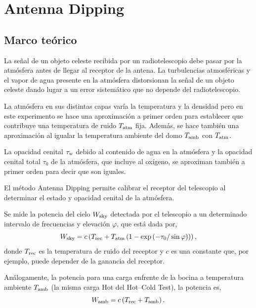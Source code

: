 \section{Antenna Dipping}\label{sec:antennadipping}

\subsection{Marco teórico}

La señal de un objeto celeste recibida por un radiotelescopio debe pasar por la atmósfera antes de llegar al receptor de la antena. La turbulencias atmosféricas y el vapor de agua presente en la atmósfera distorsionan la señal de un objeto celeste dando lugar a un error sistemático que no depende del radiotelescopio.

La atmósfera en sus distintas capas varía la temperatura y la densidad pero en este experimento se hace una aproximación a primer orden para establecer que contribuye una temperatura de ruido $T_\textnormal{atm}$ fija. Además, se hace también una aproximación al igualar la temperatura ambiente del domo $T_\textnormal{amb}$ con $T_\textnormal{atm}$.

La opacidad cenital $\tau_\textnormal{w}$ debido al contenido de agua en la atmósfera y la opacidad cenital total $\tau_0$ de la atmósfera, que incluye al oxígeno, se aproximan también a primer orden para decir que son iguales.

El método Antenna Dipping permite calibrar el receptor del telescopio al determinar el estado y opacidad cenital de la atmósfera.

Se mide la potencia del cielo $W_\textnormal{sky}$ detectada por el telescopio a un determinado intervalo de frecuencias y elevación $\varphi$, que está dada por,
\begin{equation}
W_\textnormal{sky}=c\left(T_\textnormal{rec}+T_\textnormal{atm}\left(1-\exp\left(-\tau_\textnormal{0}/\sin\varphi\right)\right)\right)
,\end{equation}
donde $T_\textnormal{rec}$ es la temperatura de ruido del receptor y $c$ es una constante que, por ejemplo, puede depender de la ganancia del receptor.

Análogamente, la potencia para una carga enfrente de la bocina a temperatura ambiente $T_\textnormal{amb}$ (la misma carga Hot del Hot--Cold Test), la potencia es,
\begin{equation}
W_\textnormal{amb}=c\left(T_\textnormal{rec}+T_\textnormal{amb}\right)
.\end{equation}

